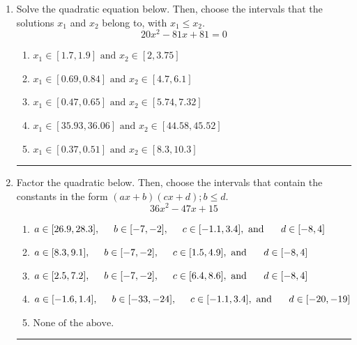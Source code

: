 \documentclass[14pt]{extbook}
\newcommand{\litem}[1]{\item#1\hspace*{-1cm}\rule{\textwidth}{0.4pt}}
\begin{document}
\begin{enumerate}
\litem{
Solve the quadratic equation below. Then, choose the intervals that the solutions $x_1$ and $x_2$ belong to, with $x_1 \leq x_2$.\[ 20x^{2} -81 x + 81 = 0 \]\begin{enumerate}[label=\Alph*.]
\item \( x_1 \in [1.7, 1.9] \text{ and } x_2 \in [2, 3.75] \)
\item \( x_1 \in [0.69, 0.84] \text{ and } x_2 \in [4.7, 6.1] \)
\item \( x_1 \in [0.47, 0.65] \text{ and } x_2 \in [5.74, 7.32] \)
\item \( x_1 \in [35.93, 36.06] \text{ and } x_2 \in [44.58, 45.52] \)
\item \( x_1 \in [0.37, 0.51] \text{ and } x_2 \in [8.3, 10.3] \)

\end{enumerate} }
\litem{
Factor the quadratic below. Then, choose the intervals that contain the constants in the form $(ax+b)(cx+d); b \leq d.$\[ 36x^{2} -47 x + 15 \]\begin{enumerate}[label=\Alph*.]
\item \( a \in [26.9, 28.3], \hspace*{5mm} b \in [-7, -2], \hspace*{5mm} c \in [-1.1, 3.4], \text{ and } \hspace*{5mm} d \in [-8, 4] \)
\item \( a \in [8.3, 9.1], \hspace*{5mm} b \in [-7, -2], \hspace*{5mm} c \in [1.5, 4.9], \text{ and } \hspace*{5mm} d \in [-8, 4] \)
\item \( a \in [2.5, 7.2], \hspace*{5mm} b \in [-7, -2], \hspace*{5mm} c \in [6.4, 8.6], \text{ and } \hspace*{5mm} d \in [-8, 4] \)
\item \( a \in [-1.6, 1.4], \hspace*{5mm} b \in [-33, -24], \hspace*{5mm} c \in [-1.1, 3.4], \text{ and } \hspace*{5mm} d \in [-20, -19] \)
\item \( \text{None of the above.} \)


\end{enumerate}}
\end{enumerate}
\end{document}
